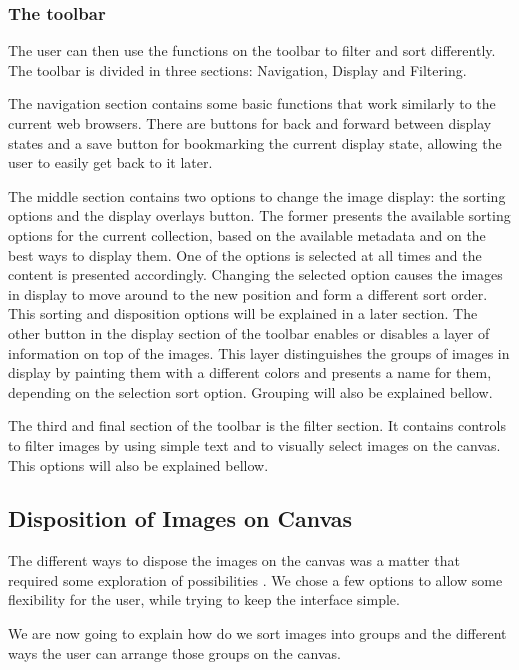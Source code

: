 \subsubsection{The toolbar}

The user can then use the functions on the toolbar to filter and sort differently. The toolbar is divided in three sections: Navigation, Display and Filtering.

The navigation section contains some basic functions that work similarly to the current web browsers. There are buttons for back and forward between display states and a save button for bookmarking the current display state, allowing the user to easily get back to it later.

The middle section contains two options to change the image display:  the sorting options and the display overlays button. The former presents the available sorting options for the current collection, based on the available metadata and on the best ways to display them. One of the options is selected at all times and the content is presented accordingly. Changing the selected option causes the images in display to move around to the new position and form a different sort order. This sorting and disposition options will be explained in a later section.
The other button in the display section of the toolbar enables or disables a layer of information on top of the images. This layer distinguishes the groups of images in display by painting them with a different colors and presents a name for them, depending on the selection sort option. Grouping will also be explained bellow. 

The third and final section of the toolbar is the filter section. It contains controls to filter images by using simple text and to visually select images on the canvas. This options will also be explained bellow.

\subsection{Disposition of Images on Canvas}

The different ways to dispose the images on the canvas was a matter that required some exploration of possibilities . We chose a few options to allow some flexibility for the user, while trying to keep the interface simple.

We are now going to explain how do we sort images into groups and the different ways the user can arrange those groups on the canvas.

